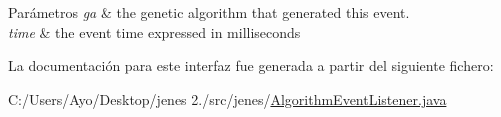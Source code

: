 \begin{DoxyParams}{Parámetros}
{\em ga} & the genetic algorithm that generated this event. \\
\hline
{\em time} & the event time expressed in milliseconds \\
\hline
\end{DoxyParams}


La documentación para este interfaz fue generada a partir del siguiente fichero\-:\begin{DoxyCompactItemize}
\item 
C\-:/\-Users/\-Ayo/\-Desktop/jenes 2./src/jenes/\hyperlink{_algorithm_event_listener_8java}{Algorithm\-Event\-Listener.\-java}\end{DoxyCompactItemize}
